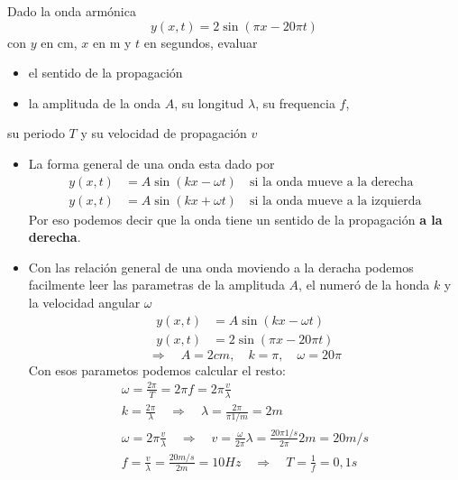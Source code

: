 \begin{ejercicio}
	Dado la onda armónica 
	$$
		y(x, t) = 2 \sin(\pi x - 20 \pi t)
	$$
	con $y$ en cm, $x$ en m y $t$ en segundos, evaluar
	\begin{itemize}
		\item el sentido de la propagación
		\item la amplituda de la onda $A$, su longitud $\lambda$, su frequencia $f$,
	\end{itemize}
su periodo $T$ y su velocidad de propagación $v$
\end{ejercicio}
\begin{itemize}
	\item 
	La forma general de una onda esta dado por
	\begin{align*}
		y(x, t) &= A \sin(kx - \omega t) \quad \text{si la onda mueve a la derecha} \\
		y(x, t) &= A \sin(kx + \omega t) \quad \text{si la onda mueve a la
	izquierda}
	\end{align*}
	Por eso podemos decir que la onda tiene un sentido de la propagación
\textbf{a la derecha}.
	\item 
	Con las relación general de una onda moviendo a la deracha podemos
facilmente leer las parametras de la amplituda $A$, el numeró de la honda $k$ y
la velocidad angular $\omega$
	\begin{align*}
		y(x, t) &= A \sin(kx - \omega t) \\
		y(x, t) &= 2 \sin(\pi x - 20 \pi t)
	\end{align*}
	$$
		\Rightarrow \quad A = 2cm, \quad k = \pi, \quad \omega = 20 \pi
	$$
	Con esos parametos podemos calcular el resto:
	\begin{align*}
		\omega = \frac{2 \pi}{T} = 2\pi f = 2\pi \frac{v}{\lambda} \\
		k = \frac{2\pi}{\lambda} \quad\Rightarrow \quad \lambda = \frac{2 \pi}{\pi 1/m} =
2m \\
	\omega = 2\pi \frac{v}{\lambda} \quad\Rightarrow \quad v =
\frac{\omega}{2\pi} \lambda = \frac{20 \pi 1/s}{2\pi} 2m = 20 m/s \\
	f = \frac{v}{\lambda} = \frac{20 m/s}{2m} = 10 Hz \quad \Rightarrow \quad T
= \frac{1}{f} = 0,1 s 
	\end{align*}	
\end{itemize}

